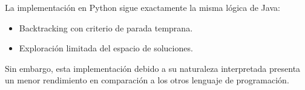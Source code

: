 La implementación en Python sigue exactamente la misma lógica de Java:

\begin{itemize}
    \item Backtracking con criterio de parada temprana.
    \item Exploración limitada del espacio de soluciones.
\end{itemize}

Sin embargo, esta implementación debido a su naturaleza interpretada presenta un menor rendimiento en comparación a los otros lenguaje de programación.

